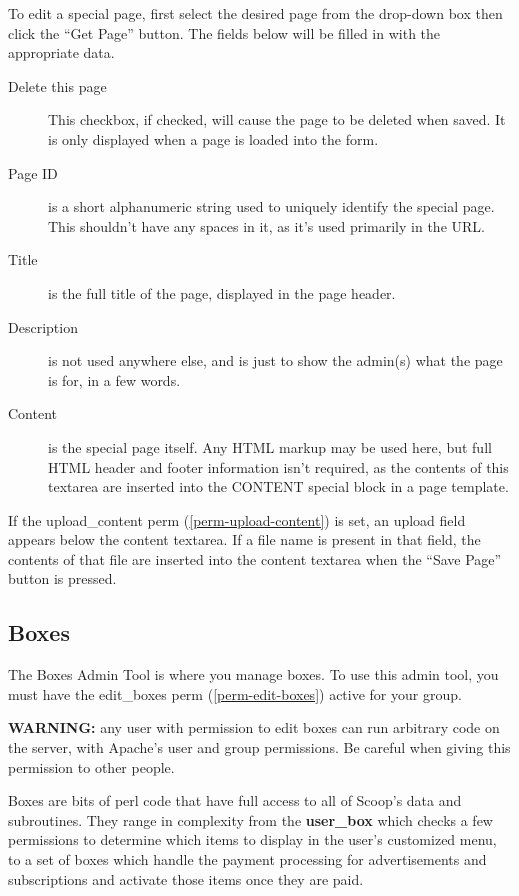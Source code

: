 To edit a special page, first select the desired page from the drop-down box then click the ``Get Page'' button.  The fields below will be filled in with the appropriate data.

\begin{description}
\item[Delete this page] This checkbox, if checked, will cause the page to be deleted when saved. It is only displayed when a page is loaded into the form.
\item[Page ID] is a short alphanumeric string used to uniquely identify the special page.  This shouldn't have any spaces in it, as it's used primarily in the URL.
\item[Title] is the full title of the page, displayed in the page header.
\item[Description] is not used anywhere else, and is just to show the admin(s) what the page is for, in a few words.
\item[Content] is the special page itself.  Any HTML markup may be used here, but full HTML header and footer information isn't required, as the contents of this textarea are inserted into the \latexhtml{$\vert$}{|}CONTENT\latexhtml{$\vert$}{|} special block in a page template.
\end{description}

If the upload\_content perm (\ref{perm-upload-content}) is set, an upload field appears below the content textarea.  If a file name is present in that field, the contents of that file are inserted into the content textarea when the ``Save Page'' button is pressed.

\subsection{Boxes}
\label{admin-tools-boxes}

The Boxes Admin Tool is where you manage boxes. To use this admin tool, you must have the edit\_boxes perm (\ref{perm-edit-boxes}) active for your group.

{\bf WARNING:} any user with permission to edit boxes can run arbitrary code on the server, with Apache's user and group permissions. Be careful when giving this permission to other people.

Boxes are bits of perl code that have full access to all of Scoop's data and subroutines. They range in complexity from the {\bf user\_box} which checks a few permissions to determine which items to display in the user's customized menu, to a set of boxes which handle the payment processing for advertisements and subscriptions and activate those items once they are paid.

